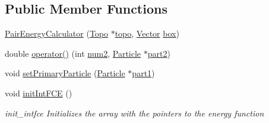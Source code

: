 \subsection*{Public Member Functions}
\begin{DoxyCompactItemize}
\item 
\hyperlink{class_pair_energy_calculator_a93de4db8e4fc6c4ca07a056e979eba45}{Pair\+Energy\+Calculator} (\hyperlink{struct_topo}{Topo} $\ast$\hyperlink{class_pair_energy_calculator_a89462e46d51f1247121a58a71831d2a2}{topo}, \hyperlink{class_vector}{Vector} \hyperlink{class_pair_energy_calculator_a4c8925567dcb6e14f832a13474486d57}{box})
\item 
double \hyperlink{class_pair_energy_calculator_ac03c8733c369cf005967fe77df01ac4d}{operator()} (int \hyperlink{class_pair_energy_calculator_a437c68a040fd7eb9f261bc2c22cf3bcf}{num2}, \hyperlink{class_particle}{Particle} $\ast$\hyperlink{class_pair_energy_calculator_a5930e66e7a0e9c3b2bd7e76391854ad2}{part2})
\item 
void \hyperlink{class_pair_energy_calculator_ab47bfdf5e4c46f750a97192d366f58c5}{set\+Primary\+Particle} (\hyperlink{class_particle}{Particle} $\ast$\hyperlink{class_pair_energy_calculator_a168122b4b21b48d25093a9e314045929}{part1})
\item 
void \hyperlink{class_pair_energy_calculator_ad6cd85c8a59e2747e491e2478ad274e1}{init\+Int\+F\+C\+E} ()
\begin{DoxyCompactList}\small\item\em init\+\_\+intfce Initializes the array with the pointers to the energy function \end{DoxyCompactList}\end{DoxyCompactItemize}
